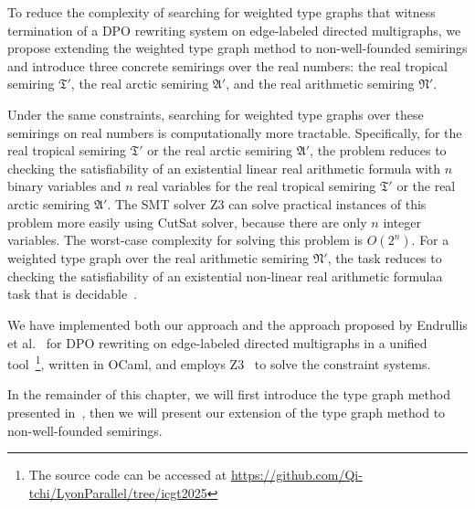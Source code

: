 To reduce the complexity of searching for weighted type graphs that witness termination of a DPO rewriting system on edge-labeled directed multigraphs, we propose extending the weighted type graph method to non-well-founded semirings and introduce three concrete semirings over the real numbers: the real tropical semiring $\mathfrak{T}'$, the real arctic semiring $\mathfrak{A}'$, and the real arithmetic semiring $\mathfrak{N}'$. 


Under the same constraints, searching for weighted type graphs over these semirings on real numbers is computationally more tractable. Specifically,
for the real tropical semiring $\mathfrak{T}'$ or the real arctic semiring $\mathfrak{A}'$, the problem reduces 
to checking the satisfiability of an 
existential linear real arithmetic formula with $n$ binary variables and $n$ real variables for the real tropical semiring $\mathfrak{T}'$ or the real arctic semiring $\mathfrak{A}'$. 
The SMT solver Z3 can solve practical instances of this problem more easily using CutSat solver, because there are only $n$ integer variables. The worst-case complexity for solving this problem is $O(2^n)$.
For a weighted type graph over the real arithmetic semiring $\mathfrak{N}'$, the task reduces to checking the satisfiability of 
an existential non-linear real arithmetic formula\textemdash a task that is decidable~\cite{collins1974quantifier,z3realarithmetic}.


We have implemented both our approach and the approach proposed by Endrullis et al.~\cite{endrullis2024generalized_arxiv_v2} for DPO rewriting on edge-labeled directed multigraphs in a unified tool~\footnote{The source code can be accessed at \url{https://github.com/Qi-tchi/LyonParallel/tree/icgt2025}}, written in OCaml, and employs Z3~\cite{de2008z3} to solve the constraint systems.

In the remainder of this chapter, we will first introduce the type graph method presented in~\cite{endrullis2024generalized_arxiv_v2}, then we will present our extension of the type graph method to non-well-founded semirings.
